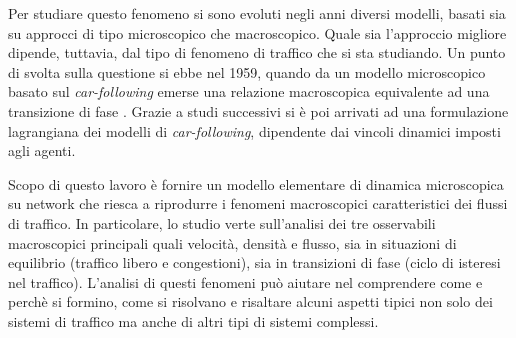 \documentclass[../main.tex]{subfiles}
\begin{document}
Per studiare questo fenomeno si sono evoluti negli anni diversi modelli, basati sia su approcci di tipo microscopico che macroscopico.
Quale sia l'approccio migliore dipende, tuttavia, dal tipo di fenomeno di traffico che si sta studiando.
Un punto di svolta sulla questione si ebbe nel 1959, quando da un modello microscopico basato sul \emph{car-following} emerse una relazione macroscopica equivalente ad una transizione di fase \cite{gazis2002origins}.
Grazie a studi successivi si \`e poi arrivati ad una formulazione lagrangiana dei modelli di \emph{car-following}, dipendente dai vincoli dinamici imposti agli agenti.

Scopo di questo lavoro \`e fornire un modello elementare di dinamica microscopica su network che riesca a riprodurre i fenomeni macroscopici caratteristici dei flussi di traffico.
In particolare, lo studio verte sull'analisi dei tre osservabili macroscopici principali quali velocit\`a, densit\`a e flusso, sia in situazioni di equilibrio (traffico libero e congestioni), sia in transizioni di fase (ciclo di isteresi nel traffico).
L'analisi di questi fenomeni pu\`o aiutare nel comprendere come e perch\`e si formino, come si risolvano e risaltare alcuni aspetti tipici non solo dei sistemi di traffico ma anche di altri tipi di sistemi complessi.
\end{document}
